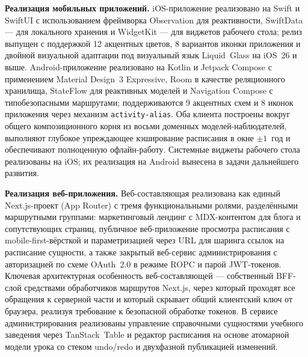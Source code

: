 \textbf{Реализация мобильных приложений.} iOS-приложение реализовано на Swift и SwiftUI с использованием фреймворка Observation для реактивности, SwiftData --- для локального хранения и WidgetKit --- для виджетов рабочего стола; релиз выпущен с поддержкой 12 акцентных цветов, 8 вариантов иконки приложения и двойной визуальной адаптации под визуальный язык Liquid~Glass на iOS~26 и выше. Android-приложение реализовано на Kotlin и Jetpack Compose с применением Material Design~3 Expressive, Room в качестве реляционного хранилища, StateFlow для реактивных моделей и Navigation Compose с типобезопасными маршрутами; поддерживаются 9 акцентных схем и 8 иконок приложения через механизм \texttt{activity-\allowbreak alias}. Оба клиента построены вокруг общего композиционного корня из восьми доменных моделей-наблюдателей, выполняют глубокое упреждающее кэширование расписания в окне $\pm 1$~год и обеспечивают полноценную офлайн-работу. Системные виджеты рабочего стола реализованы на iOS; их реализация на Android вынесена в задачи дальнейшего развития.

\textbf{Реализация веб-приложения.} Веб-составляющая реализована как единый Next.js-проект (App Router) с тремя функциональными ролями, разделёнными маршрутными группами: маркетинговый лендинг с MDX-контентом для блога и сопутствующих страниц, публичное веб-приложение просмотра расписания с mobile-first-вёрсткой и параметризацией через URL для шаринга ссылок на расписание сущности, а также закрытый веб-сервис администрирования с авторизацией по схеме OAuth~2.0 в режиме ROPC и парой JWT-токенов. Ключевая архитектурная особенность веб-составляющей --- собственный BFF-слой средствами обработчиков маршрутов Next.js, через который проходят все обращения к серверной части и который скрывает общий клиентский ключ от браузера, реализуя требование к безопасной обработке токенов. В сервисе администрирования реализованы управление справочными сущностями учебного заведения через TanStack~Table и редактор расписания на основе атомарной модели урока со стеком undo/redo и двухфазной публикацией изменений.

